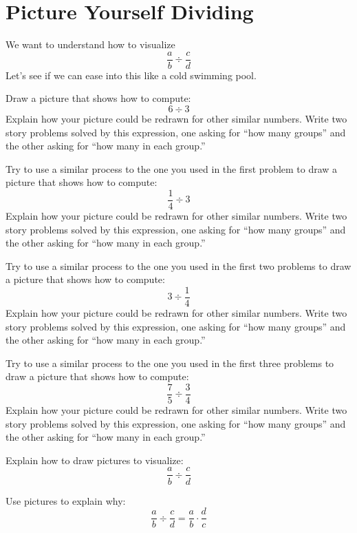 \newpage
\section{Picture Yourself Dividing}


We want to understand how to visualize 
\[
\frac{a}{b} \div \frac{c}{d}
\]
Let's see if we can ease into this like a cold swimming pool.

\begin{prob}
Draw a picture that shows how to compute:
\[
6\div 3
\]
Explain how your picture could be redrawn for other similar
numbers. Write two story problems solved by this expression, one
asking for ``how many groups'' and the other asking for ``how many in
each group.''
\end{prob}

\begin{prob}
Try to use a similar process to the one you used in the first problem
to draw a picture that shows how to compute:
\[
\frac{1}{4} \div 3
\]
Explain how your picture could be redrawn for other similar numbers.
Write two story problems solved by this expression, one asking for
``how many groups'' and the other asking for ``how many in each
group.''
\end{prob}


\begin{prob}
Try to use a similar process to the one you used in the first two problems
to draw a picture that shows how to compute:
\[
3 \div \frac{1}{4}
\]
Explain how your picture could be redrawn for other similar numbers.
Write two story problems solved by this expression, one asking for
``how many groups'' and the other asking for ``how many in each
group.''
\end{prob}


\begin{prob}
Try to use a similar process to the one you used in the first three problems
to draw a picture that shows how to compute:
\[
\frac{7}{5} \div \frac{3}{4}
\]
Explain how your picture could be redrawn for other similar numbers.
Write two story problems solved by this expression, one asking for
``how many groups'' and the other asking for ``how many in each
group.''
\end{prob}

\begin{prob}
Explain how to draw pictures to visualize:
\[
\frac{a}{b} \div \frac{c}{d}
\]
\end{prob}

\begin{prob}
Use pictures to explain why:
\[
\frac{a}{b} \div \frac{c}{d} = \frac{a}{b} \cdot \frac{d}{c}
\]
\end{prob}
